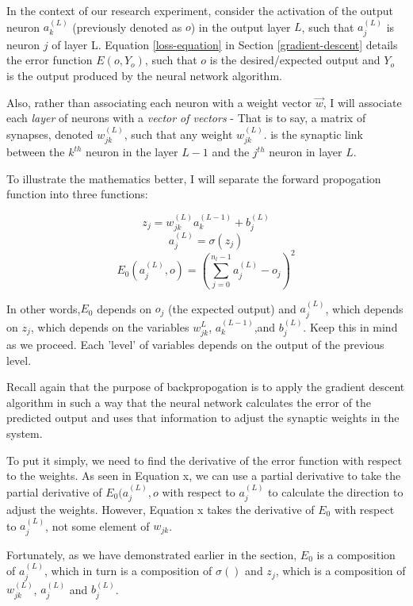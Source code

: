 \documentclass[12pt]{article}
\begin{document}

        In the context of our research experiment, consider the activation of the output neuron $a_k^{(L)}$ (previously denoted as $o$) in the output layer $L$, such that $a_j^{(L)}$ is neuron $j$ of layer L. Equation \ref{loss-equation} in Section \ref{gradient-descent} details the error function $E(o, Y_o)$, such that $o$ is the desired/expected output and $Y_o$ is the output produced by the neural network algorithm.

        Also, rather than associating each neuron with a weight vector $\vec{w}$, I will associate each \textit{layer} of neurons with a \textit{vector of vectors} - That is to say, a matrix of synapses, denoted $w_{jk}^{(L)}$, such that any weight $w_{jk}^{(L)}$. is the synaptic link between the $k^{th}$ neuron in the layer $L-1$ and the $j^{th}$ neuron in layer $L$.

        To illustrate the mathematics better, I will separate the forward propogation function into three functions:

            \[ z_j = w_{jk}^{ (L)}a_k^{(L-1)} + b_j^{(L)} \]
            \[ a_j^{(L)} =\sigma (z_j) \]
            \[ E_0(a_j^{(L)}, o) = (\sum_{j=0}^{n_l-1} a_j^{(L)} - o_j)^2 \]

        In other words,$E_0$ depends on $o_j$ (the expected output) and $a_j^{(L)}$, which depends on $z_j$, which depends on the variables $w_{jk}^{L}$, $a_k^{(L-1)}$,and $b_j^{(L)}$. Keep this in mind as we proceed. Each 'level' of variables depends on the output of the previous level. 

        Recall again that the purpose of backpropogation is to apply the gradient descent algorithm in such a way that the neural network calculates the error of the predicted output and uses that information to adjust the synaptic weights in the system.

        To put it simply, we need to find the derivative of the error function with respect to the weights. As seen in Equation x, we can use a partial derivative to take the partial derivative of \(E_0(a_j^{(L)}, o\) with respect to \(a_j^{(L)}\) to calculate the direction to adjust the weights. However, Equation x takes the derivative of \(E_0\) with respect to \(a_j^{(L)}\), not some element of $w_{jk}$.

        Fortunately, as we have demonstrated earlier in the section, $E_0$ is a composition of $a_j^{(L)}$, which in turn is a composition of $\sigma ()$ and $z_j$, which is a composition of $w_{jk}^{(L)}$, $a_j^{(L)}$ and $b_j^{(L)}$.
\end{document}
